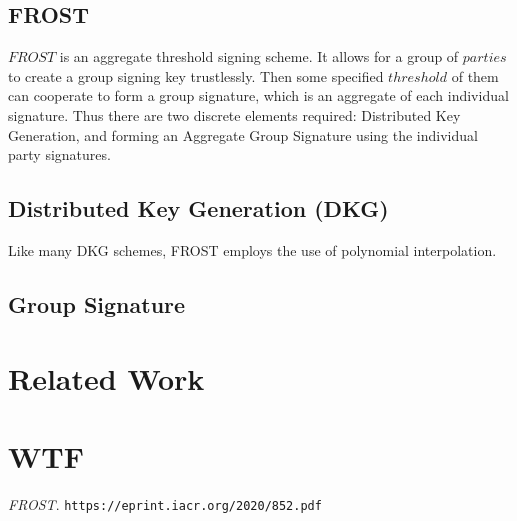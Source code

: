\documentclass{article}
\begin{document}
\subsection{
  FROST
}

$FROST$ is an aggregate threshold signing scheme.  It allows for a group of $parties$ to create a group signing key trustlessly.  Then some specified $threshold$ of them can cooperate to form a group signature, which is an aggregate of each individual signature.  Thus there are two discrete elements required: Distributed Key Generation, and forming an Aggregate Group Signature using the individual party signatures.

\subsection{
  Distributed Key Generation (DKG)
}

Like many DKG schemes, FROST employs the use of polynomial interpolation. 

\subsection{
  Group Signature
}


\newpage
\section{
  Related Work
}


\newpage
\section{
  WTF
}


\newpage
\begin{thebibliography}{1}

  \emph{FROST}.
  \texttt{https://eprint.iacr.org/2020/852.pdf}

\end{thebibliography}
\end{document}
